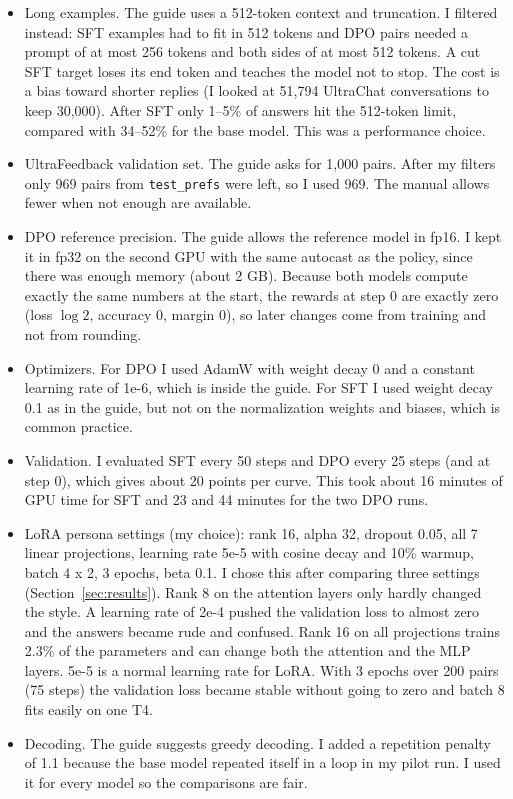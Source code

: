 \documentclass[11pt,a4paper]{article}
\begin{document}
\begin{itemize}
\item Long examples. The guide uses a 512-token context and truncation. I filtered instead: SFT examples had to fit in 512 tokens and DPO
pairs needed a prompt of at most 256 tokens and both sides of at most 512 tokens. A cut SFT target loses its end token and teaches the
model not to stop. The cost is a bias toward shorter replies (I looked at 51,794 UltraChat conversations to keep 30,000). After SFT only
1--5\% of answers hit the 512-token limit, compared with 34--52\% for the base model. This was a performance choice.
\item UltraFeedback validation set. The guide asks for 1,000 pairs. After my filters only 969 pairs from \texttt{test\_prefs} were left, so I
used 969. The manual allows fewer when not enough are available.
\item DPO reference precision. The guide allows the reference model in fp16. I kept it in fp32 on the second GPU with the same autocast as
the policy, since there was enough memory (about 2 GB). Because both models compute exactly the same numbers at the start, the rewards at
step 0 are exactly zero (loss $\log 2$, accuracy 0, margin 0), so later changes come from training and not from rounding.
\item Optimizers. For DPO I used AdamW with weight decay 0 and a constant learning rate of 1e-6, which is inside the guide. For SFT I used
weight decay 0.1 as in the guide, but not on the normalization weights and biases, which is common practice.
\item Validation. I evaluated SFT every 50 steps and DPO every 25 steps (and at step 0), which gives about 20 points per curve. This took about 16 minutes of GPU time for SFT and 23 and 44 minutes for the two DPO runs.
\item LoRA persona settings (my choice): rank 16, alpha 32, dropout 0.05, all 7 linear projections, learning rate 5e-5 with cosine decay and
10\% warmup, batch 4 x 2, 3 epochs, beta 0.1. I chose this after comparing three settings (Section~\ref{sec:results}). Rank 8 on the attention
layers only hardly changed the style. A learning rate of 2e-4 pushed the validation loss to almost zero and the answers became rude and
confused. Rank 16 on all projections trains 2.3\% of the parameters and can change both the attention and the MLP layers. 5e-5 is a normal
learning rate for LoRA. With 3 epochs over 200 pairs (75 steps) the validation loss became stable without going to zero and batch 8 fits easily
on one T4.
\item Decoding. The guide suggests greedy decoding. I added a repetition penalty of 1.1 because the base model repeated itself in a loop in my
pilot run. I used it for every model so the comparisons are fair.
\end{itemize}
\end{document}
